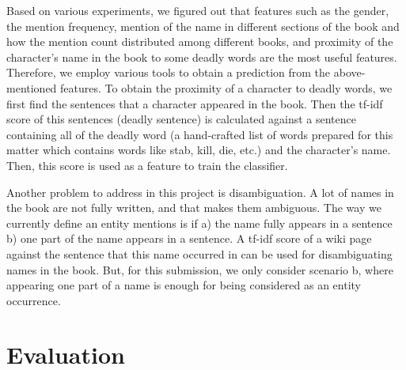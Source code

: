 \documentclass[letterpaper]{article}
\begin{document}
Based on various experiments, we figured out that features such as the gender, the mention frequency, mention of the name in different sections of the book and how the mention count distributed among different books, and proximity of the character's name in the book to some deadly words are the most useful features. Therefore, we employ various tools to obtain a prediction from the above-mentioned features. To obtain the proximity of a character to deadly words, we first find the sentences that a character appeared in the book. Then the tf-idf score of this sentences (deadly sentence) is calculated against a sentence containing all of the deadly word (a hand-crafted list of words prepared for this matter which contains words like stab, kill, die, etc.) and the character's name. Then, this score is used as a feature to train the classifier.



Another problem to address in this project is disambiguation. A lot of names in the book are not fully written, and that makes them ambiguous. The way we currently define an entity mentions is if a) the name fully appears in a sentence b) one part of the name appears in a sentence. A tf-idf score of a wiki page against the sentence that this name occurred in can be used for disambiguating names in the book. But, for this submission, we only consider scenario b, where appearing one part of a name is enough for being considered as an entity occurrence.








\section{Evaluation}
\end{document}
